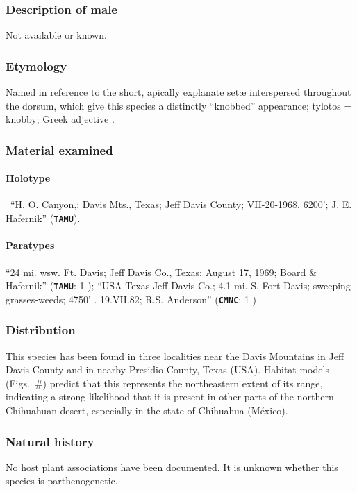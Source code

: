\documentclass[fleqn,10pt,lineno]{wlpeerj} %
\begin{document}
		\subsubsection*{Description of male}
			Not available or known.
		\subsubsection*{Etymology}
			Named in reference to the short, apically explanate set{\ae} interspersed throughout the dorsum, which give this species a distinctly ``knobbed'' appearance; tylotos = knobby; Greek adjective \citep{brown1956}.
		\subsubsection*{Material examined}
			\paragraph{Holotype}
				\female~``H. O. Canyon,; Davis Mts., Texas; Jeff Davis County; VII-20-1968, 6200'; J. E. Hafernik'' (\texttt{\textbf{TAMU}}).
			\paragraph{Paratypes}
				``24 mi. wsw. Ft. Davis; Jeff Davis Co., Texas; August 17, 1969; Board \& Hafernik'' (\texttt{\textbf{TAMU}}: 1 \female);
				``USA Texas Jeff Davis Co.; 4.1 mi. S. Fort Davis; sweeping grasses-weeds; 4750' . 19.VII.82; R.S. Anderson'' (\texttt{\textbf{CMNC}}: 1 \female)
		\subsubsection*{Distribution}
			This species has been found in three localities near the Davis Mountains in Jeff Davis County and in nearby Presidio County, Texas (USA).
			Habitat models (Figs.~\#) predict that this represents the northeastern extent of its range, indicating a strong likelihood that it is present in other parts of the northern Chihuahuan desert, especially in the state of Chihuahua (M\'{e}xico).
		\subsubsection*{Natural history}
			No host plant associations have been documented.
			It is unknown whether this species is parthenogenetic.
			
\end{document}
